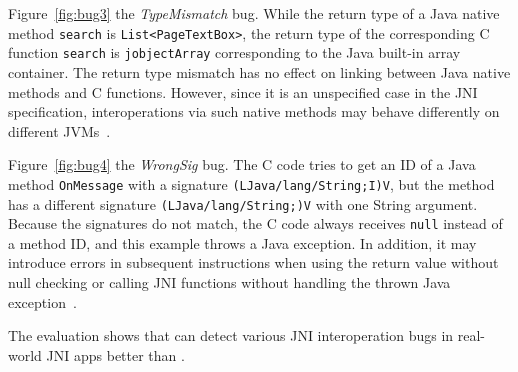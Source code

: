 Figure~\ref{fig:bug3}  the {\it TypeMismatch} bug.
While the return type of a Java native method {\tt search}
is {\tt List<PageTextBox>}, the return type of the corresponding C function
{\tt search} is {\tt jobjectArray} corresponding to the Java built-in array
container. The return type mismatch has no effect on linking between
Java native methods and C functions. However, since it is an unspecified case in
the JNI specification, interoperations via such native methods may behave
differently on different JVMs~\cite{LeeASE20}. 


Figure~\ref{fig:bug4}  the {\it WrongSig} bug.
The C code tries to get an ID of a Java method {\tt OnMessage} with a
signature \texttt{(LJava/lang/String;I)V}, but the method has a different
signature \texttt{(LJava/lang/String;)V} with one String argument. Because
the signatures do not match, the C code always receives {\tt null}
instead of a method ID, and this example throws a Java exception. In
addition, it may introduce errors in subsequent instructions when using the
return value without null checking or calling JNI functions without handling the
thrown Java exception~\cite{jniexcept}.

The evaluation shows that \ours can detect various JNI interoperation bugs in
real-world JNI apps better than \lees.
